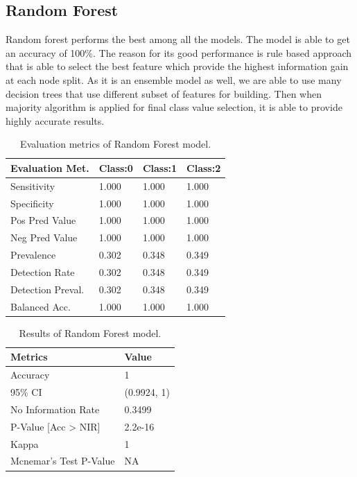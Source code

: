 \documentclass[11pt,a4paper]{article}
\begin{document}
\subsection{Random Forest}
Random forest performs the best among all the models. The model is able to get an accuracy of 100\%. The reason for its good performance is rule based approach that is able to select the best feature which provide the highest information gain at each node split. As it is an ensemble model as well, we are able to use many decision trees that use different subset of features for building. Then when majority algorithm is applied for final class value selection, it is able to provide highly accurate results.
\begin{table}[h]
	\centering
	\caption{Evaluation metrics of Random Forest model.}
	\begin{tabular}{|l|l|l|l|} 
		\hline
		\textbf{Evaluation Met.} & \textbf{Class:0} & \textbf{Class:1} & \textbf{Class:2} \\ 
		\hline
		Sensitivity                 & 1.000          & 1.000           & 1.000           \\ 
		\hline
		Specificity                 & 1.000           & 1.000           & 1.000           \\ 
		\hline
		Pos Pred Value              & 1.000           & 1.000           & 1.000           \\ 
		\hline
		Neg Pred Value              & 1.000           & 1.000           & 1.000           \\ 
		\hline
		Prevalence                  & 0.302           & 0.348         & 0.349        \\ 
		\hline
		Detection Rate              & 0.302     & 0.348           & 0.349           \\ 
		\hline
		Detection Preval.       & 0.302        & 0.348           & 0.349           \\ 
		\hline
		Balanced Acc.      & 1.000           & 1.000           & 1.000           \\
		\hline
	\end{tabular}
\end{table}
\begin{table}[h]
	\centering
	\caption{Results of Random Forest model.}
	\begin{tabular}{|l|l|} 
		\hline
		\textbf{Metrics}                 & \textbf{Value}  \\ 
		\hline
		Accuracy                         & 1               \\ 
		\hline
		95\% CI                          & (0.9924, 1)     \\ 
		\hline
		No Information Rate              & 0.3499          \\ 
		\hline
		P-Value [Acc \textgreater{} NIR] &  2.2e-16        \\ 
		\hline
		Kappa                            & 1               \\ 
		\hline
		Mcnemar's Test P-Value           & NA              \\
		\hline
	\end{tabular}
\end{table}
\end{document}
